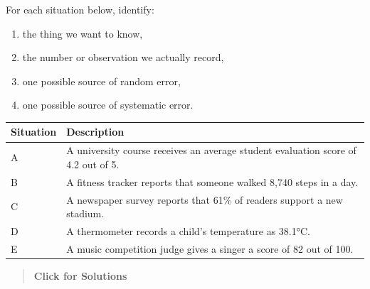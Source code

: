 \documentclass[
  letterpaper,
  DIV=11,
  numbers=noendperiod]{scrreprt}
\newcounter{none} %
\providecommand{\tightlist}{%
  \setlength{\itemsep}{0pt}\setlength{\parskip}{0pt}}
\begin{document}
\begin{tcolorbox}[enhanced jigsaw, arc=.35mm, bottomrule=.15mm, bottomtitle=1mm, breakable, colback=white, colbacktitle=quarto-callout-note-color!10!white, colframe=quarto-callout-note-color-frame, coltitle=black, left=2mm, leftrule=.75mm, opacityback=0, opacitybacktitle=0.6, rightrule=.15mm, title=\textcolor{quarto-callout-note-color}{\faInfo}\hspace{0.5em}{Question 1}, titlerule=0mm, toprule=.15mm, toptitle=1mm]

For each situation below, identify:

\begin{enumerate}
\def\labelenumi{\arabic{enumi}.}
\tightlist
\item
  the thing we want to know,
\item
  the number or observation we actually record,
\item
  one possible source of random error,
\item
  one possible source of systematic error.
\end{enumerate}

{\def\LTcaptype{none} %
\begin{longtable}[]{@{}
  >{\raggedright\arraybackslash}p{}
  >{\raggedright\arraybackslash}p{}@{}}
\toprule\noalign{}
\begin{minipage}[b]{\linewidth}\raggedright
Situation
\end{minipage} & \begin{minipage}[b]{\linewidth}\raggedright
Description
\end{minipage} \\
\midrule\noalign{}
\endhead
\bottomrule\noalign{}
\endlastfoot
A & A university course receives an average student evaluation score of
4.2 out of 5. \\
B & A fitness tracker reports that someone walked 8,740 steps in a
day. \\
C & A newspaper survey reports that 61\% of readers support a new
stadium. \\
D & A thermometer records a child's temperature as 38.1°C. \\
E & A music competition judge gives a singer a score of 82 out of
100. \\
\end{longtable}
}

\begin{quote}
\textbf{Click for Solutions}


\end{quote}
\end{tcolorbox}
\end{document}
